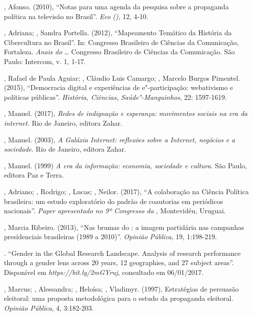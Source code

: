 \begin{Parskip}
, Afonso. (2010), ``Notas para uma agenda da pesquisa sobre a
propaganda política na televisão no Brasil''. \emph{Eco} \emph{(),}
12, 4-10.

, Adriana; , Sandra Portella. (2012), ``Mapeamento
Temático da História da Cibercultura no Brasil''. In:  Congresso
Brasileiro de Ciências da Comunicação, Fortaleza. \emph{Anais do} \ldots{}
Congresso Brasileiro de Ciências da Comunicação. São Paulo: Intercom, v.
1, 1-17.

, Rafael de Paula Aguiar; , Cláudio Luis Camargo; , Marcelo Burgos Pimentel. (2015), ``Democracia digital e
experiências de e"-participação: webativismo e políticas públicas''.
\emph{História, Ciências, Saúde"-Manguinhos}, 22: 1597-1619.

, Manuel. (2017), \emph{Redes de indignação e esperança:
movimentos sociais na era da internet.} Rio de Janeiro, editora Zahar.

, Manuel. (2003), \emph{A Galáxia Internet: reflexões sobre a
Internet, negócios e a sociedade}. Rio de Janeiro, editora Zahar.

, Manuel. (1999) \emph{A era da informação: economia, sociedade
e cultura}. São Paulo, editora Paz e Terra.

, Adriano; , Rodrigo; , Lucas; , Neilor.
(2017), ``A colaboração na Ciência Política brasileira: um estudo
exploratório do padrão de coautorias em periódicos nacionais''.
\emph{Paper apresentado no 9º Congresso da }, Montevidéu,
Uruguai.

, Marcia Ribeiro. (2013), ``Nas brumas do : a imagem partidária
nas campanhas presidenciais brasileiras (1989 a 2010)''. \emph{Opinião
Pública}, 19, 1:198-219.

. ``Gender in the Global Research Landscape. Analysis of
research performance through a gender lens across 20 years, 12
geographies, and 27 subject areas''. Disponível em
\emph{https://bit.ly/2mGYruj}, consultado em 06/01/2017.

, Marcus; , Alessandra; , Heloísa; , Vladimyr.
(1997), Estratégias de persuasão eleitoral: uma proposta metodológica
para o estudo da propaganda eleitoral. \emph{Opinião Pública}, 4,
3:182-203.


\end{Parskip}

